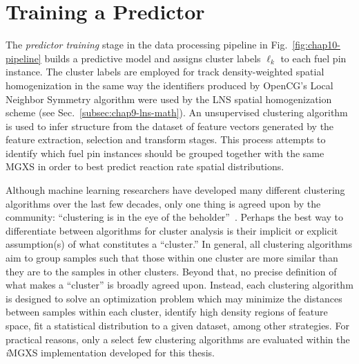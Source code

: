 

\section{Training a Predictor}
\label{sec:chap10-train-predictor}

The \textit{predictor training} stage in the data processing pipeline in Fig.~\ref{fig:chap10-pipeline} builds a predictive model and assigns cluster labels $\ell_{k}$ to each fuel pin instance. The cluster labels are employed for track density-weighted spatial homogenization in the same way the identifiers produced by OpenCG's Local Neighbor Symmetry algorithm were used by the \ac{LNS} spatial homogenization scheme (see Sec.~\ref{subsec:chap9-lns-math}). An unsupervised clustering algorithm is used to infer structure from the dataset of feature vectors generated by the feature extraction, selection and transform stages. This process attempts to identify which fuel pin instances should be grouped together with the same \ac{MGXS} in order to best predict reaction rate spatial distributions.

Although machine learning researchers have developed many different clustering algorithms over the last few decades, only one thing is agreed upon by the community: ``clustering is in the eye of the beholder''~\cite{castro2002clustering}. Perhaps the best way to differentiate between algorithms for cluster analysis is their implicit or explicit assumption(s) of what constitutes a ``cluster.'' In general, all clustering algorithms aim to group samples such that those within one cluster are more similar than they are to the samples in other clusters. Beyond that, no precise definition of what makes a ``cluster'' is broadly agreed upon. Instead, each clustering algorithm is designed to solve an optimization problem which may minimize the distances between samples within each cluster, identify high density regions of feature space, fit a statistical distribution to a given dataset, among other strategies. For practical reasons, only a select few clustering algorithms are evaluated within the \textit{i}\ac{MGXS} implementation developed for this thesis.

